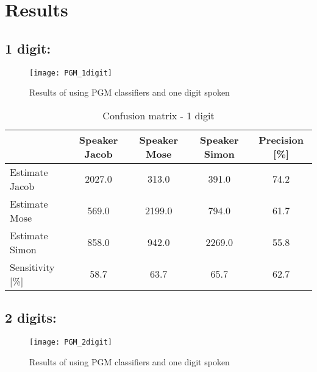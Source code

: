 \section{Results}

\subsection{1 digit:}

\begin{figure}[H]
\centering
\texttt{[image: PGM\_1digit]}
\caption{Results of using PGM classifiers and one digit spoken}
\label{fig:PGM_1dig}
\end{figure}

\begin{table}[H]                                                    
\centering                                                          
\begin{tabular}{|l|c|c|c|c|}                                        
\hline                                                              
  & Speaker Jacob & Speaker Mose & Speaker Simon & Precision [\%] \\
\hline                                                              
Estimate Jacob & 2027.0 & 313.0 & 391.0 & 74.2 \\                   
\hline                                                              
Estimate Mose & 569.0 & 2199.0 & 794.0 & 61.7 \\                    
\hline                                                              
Estimate Simon & 858.0 & 942.0 & 2269.0 & 55.8 \\                   
\hline                                                              
Sensitivity [\%] & 58.7 & 63.7 & 65.7 & 62.7 \\                     
\hline                                                              
\end{tabular}                                                       
\caption{Confusion matrix - 1 digit}                                
\label{table:PGM_conf_1}                                            
\end{table}       


\subsection{2 digits:}

\begin{figure}[H]
\centering
\texttt{[image: PGM\_2digit]}
\caption{Results of using PGM classifiers and one digit spoken}
\label{fig:PGM_1dig}
\end{figure}


